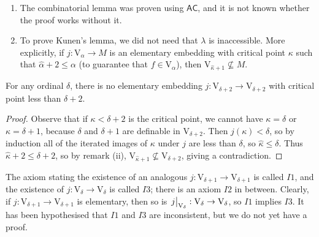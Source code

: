 \begin{remark}
    \begin{enumerate}
        \item The combinatorial lemma was proven using \( \mathsf{AC} \), and it is not known whether the proof works without it.
        \item To prove Kunen's lemma, we did not need that \( \lambda \) is inaccessible.
        More explicitly, if \( j : \mathrm{V}_\alpha \to M \) is an elementary embedding with critical point \( \kappa \) such that \( \hat\alpha + 2 \leq \alpha \) (to guarantee that \( f \in \mathrm{V}_\alpha \)), then \( \mathrm{V}_{\hat\kappa + 1} \nsubseteq M \).
    \end{enumerate}
\end{remark}
\begin{corollary}
    For any ordinal \( \delta \), there is no elementary embedding \( j : \mathrm{V}_{\delta + 2} \to \mathrm{V}_{\delta + 2} \) with critical point less than \( \delta + 2 \).
\end{corollary}
\begin{proof}
    Observe that if \( \kappa < \delta + 2 \) is the critical point, we cannot have \( \kappa = \delta \) or \( \kappa = \delta + 1 \), because \( \delta \) and \( \delta + 1 \) are definable in \( \mathrm{V}_{\delta + 2} \).
    Then \( j(\kappa) < \delta \), so by induction all of the iterated images of \( \kappa \) under \( j \) are less than \( \delta \), so \( \hat\kappa \leq \delta \).
    Thus \( \hat\kappa + 2 \leq \delta + 2 \), so by remark (ii), \( \mathrm{V}_{\hat\kappa + 1} \nsubseteq \mathrm{V}_{\delta + 2} \), giving a contradiction.
\end{proof}
The axiom stating the existence of an analogous \( j : \mathrm{V}_{\delta + 1} \to \mathrm{V}_{\delta + 1} \) is called \( I1 \), and the existence of \( j : \mathrm{V}_\delta \to \mathrm{V}_\delta \) is called \( I3 \); there is an axiom \( I2 \) in between.
Clearly, if \( j : \mathrm{V}_{\delta + 1} \to \mathrm{V}_{\delta + 1} \) is elementary, then so is \( \eval{j}_{\mathrm{V}_\delta} : \mathrm{V}_\delta \to \mathrm{V}_\delta \), so \( I1 \) implies \( I3 \).
It has been hypothesised that \( I1 \) and \( I3 \) are inconsistent, but we do not yet have a proof.
